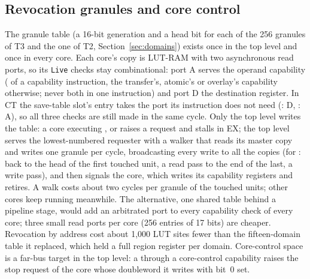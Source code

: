 \subsection{Revocation granules and core control}
The granule table (a 16-bit generation and a head bit for each of the 256 granules of T3 and the one of
T2, Section~\ref{sec:domains}) exists once in the top level and once in every core. Each core's copy is
LUT-RAM with two asynchronous read ports, so its \texttt{Live} checks stay combinational: port A
serves the operand capability ( of a capability instruction, the transfer's, atomic's or
overlay's capability otherwise; never both in one instruction) and port D the destination register.
In CT the save-table slot's entry takes the port its instruction does not need (: D,
: A), so all three checks are still made in the same cycle. Only the top level writes the table: a core executing ,
 or  raises a request and stalls in EX; the top level serves the
lowest-numbered requester with a walker that reads its master copy and writes one granule per cycle,
broadcasting every write to all the copies (for : back to the head of the first touched
unit, a read pass to the end of the last, a write pass), and then signals the core, which writes its
capability registers and retires. A walk costs about two cycles per granule of the touched units; other
cores keep running meanwhile. The alternative, one shared table behind a pipeline stage, would add an
arbitrated port to every capability check of every core; three small read ports per core (256 entries
of 17 bits) are cheaper. Revocation by address cost about 1,000 LUT sites fewer than the
fifteen-domain table it replaced, which held a full region register per domain. Core-control space is
a far-bus target in the top level: a  through a core-control capability raises the stop request of the core whose doubleword it
writes with bit~0 set.

